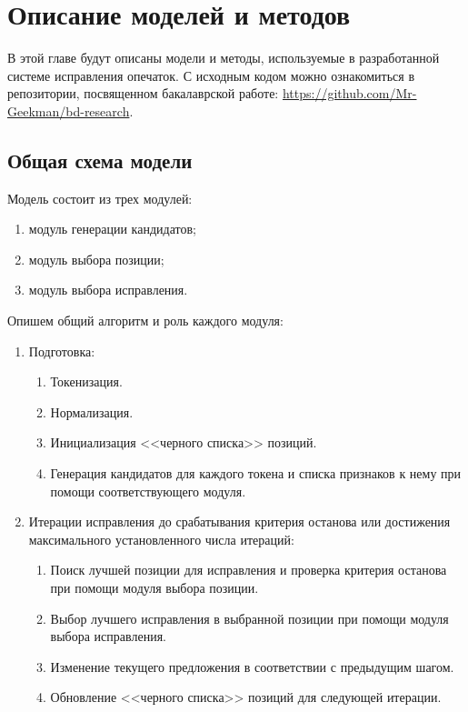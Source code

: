\chapter{Описание моделей и методов}

В этой главе будут описаны модели и методы, используемые в разработанной системе исправления опечаток. С исходным кодом можно ознакомиться в репозитории, посвященном бакалаврской работе: \url{https://github.com/Mr-Geekman/bd-research}.

\section{Общая схема модели}

Модель состоит из трех модулей:
\begin{enumerate}
	\item модуль генерации кандидатов;
	\item модуль выбора позиции;
	\item модуль выбора исправления.
\end{enumerate}

Опишем общий алгоритм и роль каждого модуля:
\begin{enumerate}
	\item Подготовка:
	\begin{enumerate}
		\item Токенизация.
		\item Нормализация.
		\item Инициализация <<черного списка>> позиций.
		\item Генерация кандидатов для каждого токена и списка признаков к нему при помощи соответствующего модуля.
	\end{enumerate}
	\item Итерации исправления до срабатывания критерия останова или достижения максимального установленного числа итераций:
	\begin{enumerate}
		\item Поиск лучшей позиции для исправления и проверка критерия останова при помощи модуля выбора позиции.
		\item Выбор лучшего исправления в выбранной позиции при помощи модуля выбора исправления.
		\item Изменение текущего предложения в соответствии с предыдущим шагом.
		\item Обновление <<черного списка>> позиций для следующей итерации.
	\end{enumerate}
\end{enumerate}

